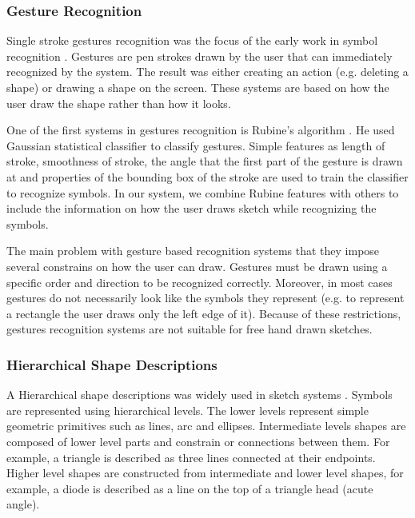 \subsubsection{Gesture Recognition}
\label{sec:GuestureRecognition}

Single stroke gestures recognition was the focus of the early work in symbol recognition \cite{gestureexample12,aideddesgin22,sketchinginterfaces2}.  Gestures are pen strokes drawn by the user that can immediately recognized by the system. The result was either creating an action (e.g. deleting a shape) or drawing a shape on the screen. These systems are based on how the user draw the shape rather than how it looks. 

One of the first systems in gestures recognition is Rubine's algorithm \cite{gestureexample12} . He used Gaussian statistical classifier to classify gestures.  Simple features as length of stroke, smoothness of stroke, the angle that the first part of the gesture is drawn at and properties of the bounding box of the stroke are used to train the classifier to recognize symbols. In our system, we combine Rubine features with others to include the information on how the user draws sketch while recognizing the symbols. %

The main problem with gesture based recognition systems that they impose several constrains on how the user can draw. Gestures must be drawn using a specific order and direction to be recognized correctly. Moreover, in most cases gestures do not necessarily look like the symbols they represent (e.g. to represent a rectangle the user draws only the left edge of it). Because of these restrictions, gestures recognition systems are not suitable for free hand drawn sketches. 

\subsubsection{Hierarchical Shape Descriptions}

A Hierarchical shape descriptions was widely used in sketch systems \cite{sketchunderstanding1,HierarchicalParsing7,Ladder30,AlvaradoFreedom42,napkinGross}. Symbols are represented using hierarchical levels. The lower levels represent simple geometric primitives such as lines, arc and ellipses. Intermediate levels shapes are composed of lower level parts and constrain or connections between them. For example, a triangle is described as three lines connected at their endpoints. Higher level shapes are constructed from intermediate and lower level shapes, for example, a diode is described as a line on the top of a triangle head (acute angle).

